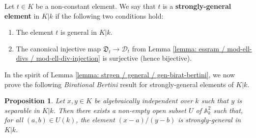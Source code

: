 \documentclass[11pt]{amsart}
\newtheorem{proposition}{Proposition}[section]
\theoremstyle{definition}
\theoremstyle{remark}
\numberwithin{equation}{section}
\newcommand{\Abb}{\mathbb{A}}
\newcommand{\Dcal}{\mathscr{D}}
\newcommand{\Dfrak}{\mathfrak{D}}
\begin{document}
Let $t \in K$ be a non-constant element.
We say that $t$ is a {\bf strongly-general element} in $K|k$ if the following two conditions hold:
\begin{enumerate}
  \item The element $t$ is general in $K|k$.
  \item The canonical injective map $\Dfrak_t \rightarrow \Dcal_t$ from Lemma \ref{lemma: essram / mod-ell-divs / mod-ell-div-injection} is surjective (hence bijective).
\end{enumerate}
In the spirit of Lemma \ref{lemma: strgen / general / gen-birat-bertini}, we now prove the following \emph{Birational Bertini} result for strongly-general elements of $K|k$.

\begin{proposition}
\label{proposition: strgen / strgen / strgen-birat-bertini}
  Let $x,y \in K$ be algebraically independent over $k$ such that $y$ is separable in $K|k$.
  Then there exists a non-empty open subset $U$ of $\Abb^2_k$ such that, for all $(a,b) \in U(k)$, the element $(x-a)/(y-b)$ is strongly-general in $K|k$.
\end{proposition}
\end{document}
